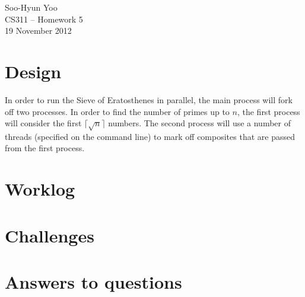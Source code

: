 \documentclass[12pt,letterpaper]{article}
\begin{document}
Soo-Hyun Yoo \\
CS311 -- Homework 5 \\
19 November 2012


\section*{Design}

In order to run the Sieve of Eratosthenes in parallel, the main process will
fork off two processes. In order to find the number of primes up to $n$, the
first process will consider the first $\lceil\sqrt{n}\rceil$ numbers. The
second process will use a number of threads (specified on the command line) to
mark off composites that are passed from the first process.



\section*{Worklog}


\section*{Challenges}


\section*{Answers to questions}
\end{document}
